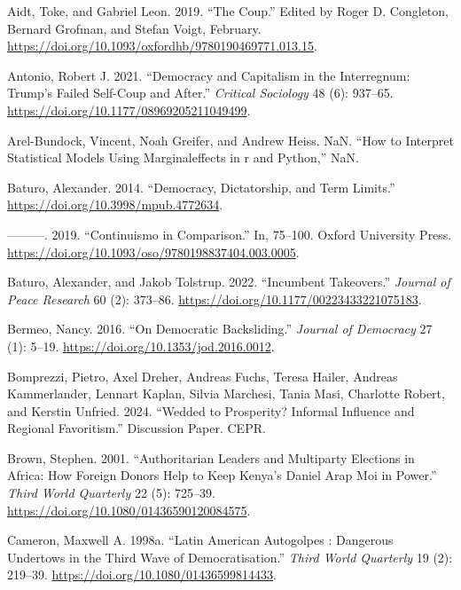 \documentclass[
  12pt,
]{report}
\newlength{\cslhangindent}
\newenvironment{CSLReferences}[2] %
 {\begin{list}{}{%
  \setlength{\itemindent}{0pt}
  \setlength{\leftmargin}{0pt}
  \setlength{\parsep}{0pt}
  \ifodd #1
   \setlength{\leftmargin}{\cslhangindent}
   \setlength{\itemindent}{-1\cslhangindent}
  \fi
  \setlength{\itemsep}{#2\baselineskip}}}
 {\end{list}}
\begin{document}
\label{refs}
\begin{CSLReferences}{1}{0}
Aidt, Toke, and Gabriel Leon. 2019. {``The Coup.''} Edited by Roger D.
Congleton, Bernard Grofman, and Stefan Voigt, February.
\url{https://doi.org/10.1093/oxfordhb/9780190469771.013.15}.

Antonio, Robert J. 2021. {``Democracy and Capitalism in the Interregnum:
Trump{'}s Failed Self-Coup and After.''} \emph{Critical Sociology} 48
(6): 937--65. \url{https://doi.org/10.1177/08969205211049499}.

Arel-Bundock, Vincent, Noah Greifer, and Andrew Heiss. NaN. {``How to
Interpret Statistical Models Using
{\textbraceleft}Marginaleffects{\textbraceright} in
{\textbraceleft}r{\textbraceright} and
{\textbraceleft}Python{\textbraceright},''} NaN.

Baturo, Alexander. 2014. {``Democracy, Dictatorship, and Term Limits.''}
\url{https://doi.org/10.3998/mpub.4772634}.

---------. 2019. {``Continuismo in Comparison.''} In, 75--100. Oxford
University Press.
\url{https://doi.org/10.1093/oso/9780198837404.003.0005}.

Baturo, Alexander, and Jakob Tolstrup. 2022. {``Incumbent Takeovers.''}
\emph{Journal of Peace Research} 60 (2): 373--86.
\url{https://doi.org/10.1177/00223433221075183}.

Bermeo, Nancy. 2016. {``On Democratic Backsliding.''} \emph{Journal of
Democracy} 27 (1): 5--19. \url{https://doi.org/10.1353/jod.2016.0012}.

Bomprezzi, Pietro, Axel Dreher, Andreas Fuchs, Teresa Hailer, Andreas
Kammerlander, Lennart Kaplan, Silvia Marchesi, Tania Masi, Charlotte
Robert, and Kerstin Unfried. 2024. {``Wedded to Prosperity? Informal
Influence and Regional Favoritism.''} Discussion Paper. CEPR.

Brown, Stephen. 2001. {``Authoritarian Leaders and Multiparty Elections
in Africa: How Foreign Donors Help to Keep Kenya's Daniel Arap Moi in
Power.''} \emph{Third World Quarterly} 22 (5): 725--39.
\url{https://doi.org/10.1080/01436590120084575}.

Cameron, Maxwell A. 1998a. {``Latin American Autogolpes : Dangerous
Undertows in the Third Wave of Democratisation.''} \emph{Third World
Quarterly} 19 (2): 219--39.
\url{https://doi.org/10.1080/01436599814433}.


\end{CSLReferences}
\end{document}

